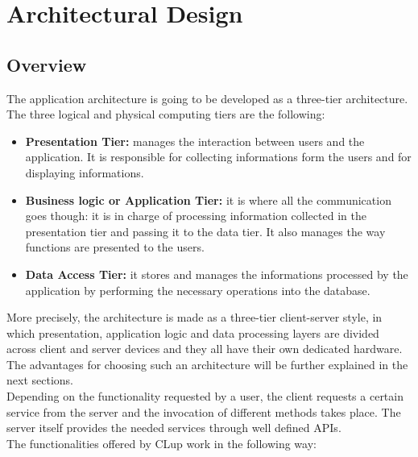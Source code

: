 \documentclass{article}
\begin{document}
\section{Architectural Design}
\subsection{Overview}
The application architecture is going to be developed as a three-tier architecture. The three logical and physical computing tiers are the following:
\begin{itemize}
\item\textbf{Presentation Tier:} manages the interaction between users and the application. It is responsible for collecting informations form the users and for displaying informations.
\item\textbf{Business logic or Application Tier:} it is where all the communication goes though: it is in charge of processing information collected in the presentation tier and passing it to the data tier. It also manages the way functions are presented to the users.
\item\textbf{Data Access Tier:} it stores and manages the informations processed by the application by performing the necessary operations into the database.
\end{itemize}
More precisely, the architecture is made as a three-tier client-server style, in which presentation, application logic and data processing layers are divided across client and server devices and they all have their own dedicated hardware. The advantages for choosing such an architecture will be further explained in the next sections.
\smallskip\\
Depending on the functionality requested by a user, the client requests a certain service from the server and the invocation of different methods takes place. The server itself provides the needed services through well defined APIs.
\smallskip\\
The functionalities offered by CLup work in the following way:
\end{document}
